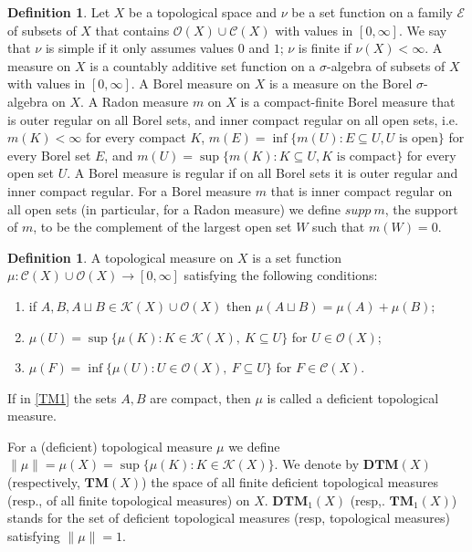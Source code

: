 \documentclass[sn-mathphys-num]{sn-jnl}%
\theoremstyle{thmstyleone}%
\theoremstyle{definition}
\newtheorem{definition}[theorem]{Definition}
\begin{document}
\begin{definition} \label{MDe2}
Let $X$ be a  topological space and $\nu$ be a set function on a family $\mathcal{E}$ of subsets of $X$ that 
contains $\mathscr{O}(X) \cup \mathscr{C}(X)$
with values in $[0, \infty]$. 
We say that $\nu$ is simple if it only assumes  values $0$ and $1$; $\nu$ is finite if $ \nu(X) < \infty$.
A measure on $X$ is a countably additive set function on a $\sigma$-algebra of subsets of $X$ with values in $[0, \infty]$.  
A Borel measure on $X$ is a measure on the Borel $\sigma$-algebra on $X$.  
A Radon measure  $m$  on $X$ is a compact-finite Borel measure that is outer regular on all Borel sets, and inner compact regular on all open sets, i.e.
$m(K) < \infty$ for every compact $K$, 
$ m(E) = \inf \{ m(U): E \subseteq U, U \text{  is open} \} $ for every Borel set $E$, and 
$m(U) = \sup \{  m(K): K \subseteq U, K  \text{  is compact} \}$ for every open set $U$. 
A Borel measure is regular if on all Borel sets it is outer regular and inner compact regular.   
For a Borel measure  $m$ that is inner compact regular on all open sets (in particular, for a Radon measure)  we define $supp \ m$,  the support of  $m$, 
to be the complement of the largest open set $W$ such that $m(W) =0$. 
\end{definition}

\begin{definition}\label{TMLC}
A topological measure on $X$ is a set function
$\mu:  \mathscr{C}(X) \cup \mathscr{O}(X)  \longrightarrow  [0,\infty]$ satisfying the following conditions:
\begin{enumerate}[label=(TM\arabic*),ref=(TM\arabic*)]
\item \label{TM1} 
if $A,B, A \sqcup B \in \mathscr{K}(X) \cup \mathscr{O}(X) $ then
$
\mu(A\sqcup B)=\mu(A)+\mu(B);
$
\item \label{TM2}  
$
\mu(U)=\sup\{\mu(K):K \in \mathscr{K}(X), \  K \subseteq U\}
$ for $U\in\mathscr{O}(X)$;
\item \label{TM3}
$
\mu(F)=\inf\{\mu(U):U \in \mathscr{O}(X), \ F \subseteq U\}
$ for  $F \in \mathscr{C}(X)$.
\end{enumerate}
If in \ref{TM1}  the sets  $A,B$ are compact, then $\mu$ is called a deficient topological measure. 

For a (deficient) topological measure  $\mu$ we define $ \| \mu \| = \mu(X) = \sup \{ \mu(K): K \in \mathscr{K}(X) \}$.
We denote by $ \mathbf{DTM}(X)$ (respectively, $ \mathbf{TM}(X)$) the space of all finite deficient topological measures 
(resp., of all finite topological measures) on $X$.  $\mathbf{DTM}_1(X)$ (resp,.  $ \mathbf{TM}_1(X)$) stands for the set of 
deficient topological measures (resp, topological measures) satisfying $ \| \mu \| = 1$. 
\end{definition} 
\end{document}
